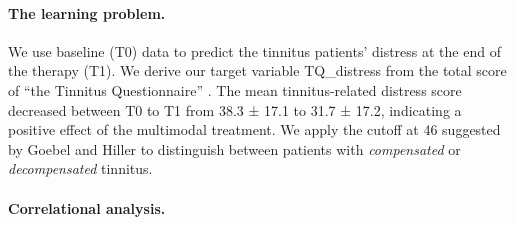 \documentclass[
  oneside]{book}
\begin{document}
\paragraph*{The learning problem.}

We use baseline (T0) data to predict the tinnitus patients' distress at the end of the therapy (T1).
We derive our target variable TQ\_distress from the total score of ``the Tinnitus Questionnaire'' \autocite{GoebelHiller:TF1998}.
The mean tinnitus-related distress score decreased between T0 to T1 from 38.3 ± 17.1 to 31.7 ± 17.2, indicating a positive effect of the multimodal treatment.
We apply the cutoff at 46 suggested by Goebel and Hiller \autocite{GoebelHiller:TF1998} to distinguish between patients with \emph{compensated} or \emph{decompensated} tinnitus.

\paragraph*{Correlational analysis.}
\end{document}
